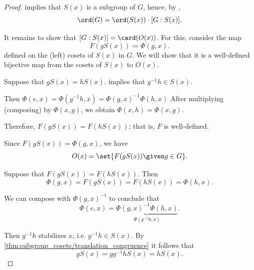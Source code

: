 \begin{proof}
   implies that \( S(x) \) is a subgroup of \( G \), hence, by ,
  \begin{equation*}
    \ord(G) = \ord(S(x)) \cdot [G: S(x)].
  \end{equation*}

  It remains to show that \( [G: S(x)] = \card(O(x)) \). For this, consider the map
  \begin{equation*}
    F(g S(x)) \coloneqq \Phi(g, x).
  \end{equation*}
  defined on the (left) cosets of \( S(x) \) in \( G \). We will show that it is a well-defined bijective map from the cosets of \( S(x) \) to \( O(x) \).

   Suppose that \( g S(x) = h S(x) \).  implies that \( g^{-1} h \in S(x) \).

  Then \( \Phi(e, x) = \Phi(g^{-1} h, x) = \Phi(g, x)^{-1} \Phi(h, x) \) After multiplying (composing) by \( \Phi(x, g) \), we obtain \( \Phi(x, h) = \Phi(x, g) \).

  Therefore, \( F(g S(x)) = F(h S(x)) \); that is, \( F \) is well-defined.

   Since \( F(g S(x)) = \Phi(g, x) \), we have
  \begin{equation*}
    O(x) = \set{ F(g S(x)) \given g \in G }.
  \end{equation*}

   Suppose that \( F(g S(x)) = F(h S(x)) \). Then
  \begin{equation*}
    \Phi(g, x) = F(g S(x)) = F(h S(x)) = \Phi(h, x).
  \end{equation*}

  We can compose with \( \Phi(g, x)^{-1} \) to conclude that
  \begin{equation*}
    \Phi(e, x) = \underbrace{\Phi(g, x)^{-1} \Phi(h, x)}_{\Phi(g^{-1} h, x)}.
  \end{equation*}

  Then \( g^{-1} h \) stabilizes \( x \), i.e. \( g^{-1} h \in S(x) \). By \cref{thm:subgroup_cosets/translation_congruence} it follows that
  \begin{equation*}
    g S(x) = g g^{-1} h S(x) = h S(x).
  \end{equation*}
\end{proof}
